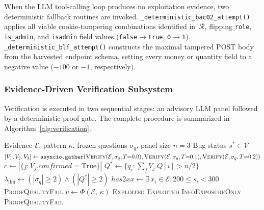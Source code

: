 When the LLM tool-calling loop produces no exploitation evidence,
two deterministic fallback routines are invoked.
\texttt{\_deterministic\_bac02\_attempt()} applies all viable
cookie-tampering combinations identified in~$\mathcal{R}$, flipping
\texttt{role}, \texttt{is\_admin}, and \texttt{isadmin} field values
(\texttt{false}$\to$\texttt{true}, \texttt{0}$\to$\texttt{1}).
\texttt{\_deterministic\_blf\_attempt()} constructs the maximal tampered
POST body from the harvested endpoint schema, setting every money or
quantity field to a negative value ($-100$ or $-1$, respectively).

\subsubsection{Evidence-Driven Verification Subsystem}

Verification is executed in two sequential stages: an advisory LLM
panel followed by a deterministic proof gate.
The complete procedure is summarized in
Algorithm~\ref{alg:verification}.

\begin{algorithm}[htbp]
\caption{Two-Stage Verification}
\label{alg:verification}
\begin{algorithmic}[1]
\Require Evidence $\mathcal{E}$, pattern $\kappa$,
         frozen questions $\sigma_q$, panel size $n = 3$
\Ensure Bug status $s^* \in \mathcal{V}$
\State $[V_1, V_2, V_3] \gets \texttt{asyncio.gather}(
       \textsc{Verify}(\mathcal{E}, \sigma_q, T{=}0.0),
       \textsc{Verify}(\mathcal{E}, \sigma_q, T{=}0.1),
       \textsc{Verify}(\mathcal{E}, \sigma_q, T{=}0.2))$
\State $c \gets |\{j : V_j.\mathit{confirmed} = \text{True}\}|$
\State $Q^* \gets \{q_i : \textstyle\sum_j V_j.Q[i] > n/2\}$
\State $\lambda_{\mathrm{llm}} \gets (|\sigma_q| \geq 2)
       \wedge (|Q^*| \geq 2)$
\State $\mathit{has2xx} \gets \exists\, x_i \in \mathcal{E} :
       200 \leq s_i < 300$
  \State \Return \textsc{ProofQualityFail}
\EndIf
\State $v \gets \Phi(\mathcal{E},\, \kappa)$
  \State \Return \textsc{Exploited}
  \State \Return \textsc{Exploited}
  \State \Return \textsc{InfoExposureOnly}
\Else
  \State \Return \textsc{ProofQualityFail}
\EndIf
\end{algorithmic}
\end{algorithm}

